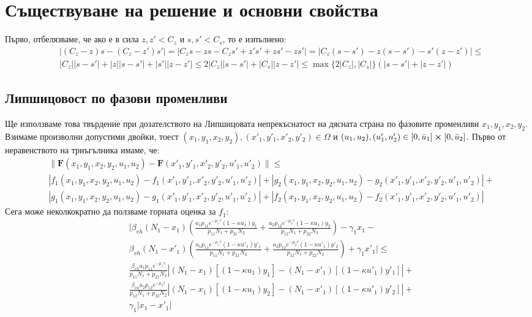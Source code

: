 \section{Съществуване на решение и основни свойства}
Първо, отбелязваме, че ако е в сила $z, z' < C_z$ и $s, s' < C_s$, то е изпълнено:
\begin{align*}
  &|(C_z - z) s - (C_z - z') s'| =
  |C_z s - z s - C_z s' + z' s' + z s' - z s'| =
  |C_z (s - s') - z (s - s') - s' (z - z')| \leq \\
  &|C_z| |s - s'| + |z| |s - s'| + |s'| |z - z'| \leq
  2 |C_z| |s - s'|  + |C_s| |z - z'| \leq
  \max\{2 |C_z|, |C_s|\} (|s-s'| + |z - z'|)
\end{align*}

\subsection{Липшицовост по фазови променливи}
Ще използваме това твърдение при дозателството на Липшицовата непрекъснатост на дясната страна по фазовите променливи $x_1, y_1, x_2, y_2$. Взимаме произволни допустими двойки, тоест $(x_1, y_1, x_2, y_2), (x'_1, y'_1, x'_2, y'_2) \in \Omega$ и $(u_1, u_2), (u'_1, u'_2) \in [0, \bar{u}_1] \cross [0, \bar{u}_2]$.
Първо от неравенството на триъгълника имаме, че:
\begin{align*}
  &\|\mathbf{F}(x_1, y_1, x_2, y_2, u_1, u_2) - \mathbf{F}(x'_1, y'_1, x'_2, y'_2, u'_1, u'_2)\| \leq \\
  &|f_1(x_1, y_1, x_2, y_2, u_1, u_2) - f_1(x'_1, y'_1, x'_2, y'_2, u'_1, u'_2)| + |g_2(x_1, y_1, x_2, y_2, u_1, u_2) - g_2(x'_1, y'_1, x'_2, y'_2, u'_1, u'_2)| + \\
  &|g_1(x_1, y_1, x_2, y_2, u_1, u_2) - g_1(x'_1, y'_1, x'_2, y'_2, u'_1, u'_2)| + |f_2(x_1, y_1, x_2, y_2, u_1, u_2) - f_2(x'_1, y'_1, x'_2, y'_2, u'_1, u'_2)|
\end{align*}
Сега може неколкократно да ползваме горната оценка за $f_1$:
\begin{align*}
  &\bigg|\beta_{vh} (N_1-x_1) \left(\frac{a_1 p_{11} e^{-\mu_1 \tau} (1-\kappa u_1) y_1}{p_{11} N_1 + p_{21} N_2} + \frac{a_2 p_{12} e^{-\mu_2 \tau} (1-\kappa u_1) y_2}{p_{12} N_1 + p_{22} N_2 }\right) - \gamma_1 x_1 - \\
  &\beta_{vh} (N_1-x'_1) \left(\frac{a_1 p_{11} e^{-\mu_1 \tau} (1-\kappa u'_1) y'_1}{p_{11} N_1 + p_{21} N_2} + \frac{a_2 p_{12} e^{-\mu_2 \tau} (1-\kappa u'_1) y'_2}{p_{12} N_1 + p_{22} N_2 }\right) + \gamma_1 x'_1\bigg| \leq \\
  &\frac{\beta_{vh} a_1 p_{11} e^{-\mu_1 \tau}}{p_{11} N_1 + p_{21} N_2} \left|(N_1-x_1) [(1-\kappa u_1) y_1] - (N_1-x'_1) [(1-\kappa u'_1) y'_1]\right| + \\
  &\frac{\beta_{vh} a_2 p_{12} e^{-\mu_2 \tau}}{p_{12} N_1 + p_{22} N_2} \left|(N_1-x_1) [(1-\kappa u_1) y_2] - (N_1-x'_1) [(1-\kappa u'_1) y'_2]\right| + \\
  &\gamma_1 |x_1-x'_1|
\end{align*}
